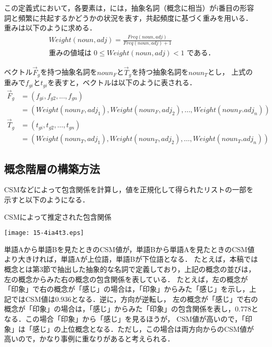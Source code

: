 \documentclass[japanese]{jnlp_1.4}
\begin{document}
この定義式において，各要素は，には，抽象名詞（概念に相当）がi番目の形容詞と頻繁に共起するかどうかの状況を表す，共起頻度に基づく重みを用いる．
重みは以下のように求める．
\begin{gather}
 \mathit{Weight}(\mathit{noun}, \mathit{adj}) = \frac{\mathit{Freq} (\mathit{noun}, \mathit{adj})}{\mathit{Freq} (\mathit{noun}, \mathit{adj}) + 1} \\
\text{重みの値域は $0 \leq \mathit{Weight}(\mathit{noun}, \mathit{adj}) < 1$ である．}
\nonumber
\end{gather}

ベクトル$\overrightarrow{F}_g$を持つ抽象名詞を$\mathit{noun}_F$と$\overrightarrow{T}_g$を持つ抽象名詞を$\mathit{noun}_T$とし，
上式の重みで$f_{gi}とt_{gi}$を表すと，ベクトルは以下のように表される．
\begin{align}
 \overrightarrow{F}_g &= (f_{gi}, f_{g2}, ... , f_{gn})  \nonumber \\
    &= (\mathit{Weight}(\mathit{noun}_F, \mathit{adj}_1), 
	\mathit{Weight}(\mathit{noun}_F, \mathit{adj}_2), \dots , 
	\mathit{Weight}(\mathit{noun}_F. \mathit{adj}_n)) \nonumber \\
 \overrightarrow{T}_g &= (t_{gi}, t_{g2}, \dots , t_{gn})  \nonumber \\
     &= (\mathit{Weight}(\mathit{noun}_T, \mathit{adj}_1), 
	\mathit{Weight}(\mathit{noun}_T, \mathit{adj}_2), \dots , 
	\mathit{Weight}(\mathit{noun}_T. \mathit{adj}_n)) 
\end{align}


\subsection{概念階層の構築方法}
CSMなどによって包含関係を計算し，値を正規化して得られたリストの一部を示すと以下のようになる．
\vspace{-1\baselineskip}

\begin{table}[h]
\caption{CSMによって推定された包含関係}
\begin{center}
\texttt{[image: 15-4ia4t3.eps]}
\end{center}
\vspace{-2\baselineskip}
\end{table}

単語Aから単語Bを見たときのCSM値が，単語Bから単語Aを見たときのCSM値より大きければ，単語Aが上位語，単語Bが下位語となる．
たとえば，本稿では概念とは第3節で抽出した抽象的な名詞で定義しており，上記の概念の並びは，左の概念からみた右の概念の包含関係を表している．
たとえば，左の概念が「印象」で右の概念が「感じ」の場合は，「印象」からみた「感じ」を示し，上記ではCSM値は0.936となる．逆に，方向が逆転し，
左の概念が「感じ」で右の概念が「印象」の場合は，「感じ」からみた「印象」の包含関係を表し，0.778となる．この場合「印象」から「感じ」を見るほうが，
CSM値が高いので，「印象」は「感じ」の上位概念となる．ただし，この場合は両方向からのCSM値が高いので，かなり事例に重なりがあると考えられる．
\end{document}
